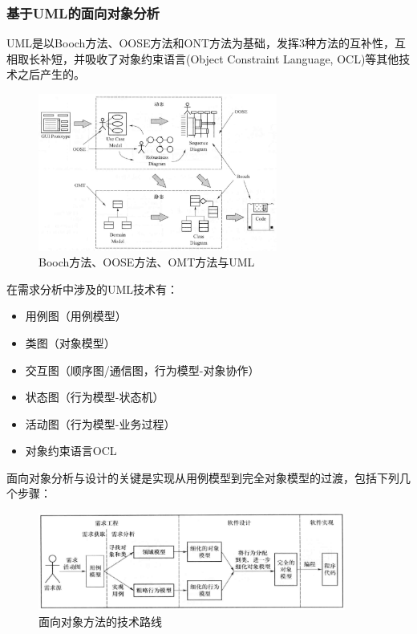 \subsubsection{基于UML的面向对象分析}
UML是以Booch方法、OOSE方法和ONT方法为基础，发挥3种方法的互补性，互相取长补短，并吸收了对象约束语言(Object Constraint Language, OCL)等其他技术之后产生的。
\begin{figure}[H]
	\centering
    \vspace{-0.5em}
	\includegraphics[width=0.7\textwidth]{img/Booch方法、OOSE方法、OMT方法与UML.png}
    \caption*{Booch方法、OOSE方法、OMT方法与UML}
    \vspace{-1em}
\end{figure}

在需求分析中涉及的UML技术有：
\vspace{-0.8em}
\begin{multicols}{2}
    \begin{itemize}
        \item 用例图（用例模型）
        \item 类图（对象模型）
        \item 交互图（顺序图/通信图，行为模型-对象协作）
        \item 状态图（行为模型-状态机）
        \item 活动图（行为模型-业务过程）
        \item 对象约束语言OCL
    \end{itemize}
\end{multicols}
\vspace{-1em}

面向对象分析与设计的关键是实现从用例模型到完全对象模型的过渡，包括下列几个步骤：
\begin{figure}[H]
	\centering
    \vspace{-0.5em}
	\includegraphics[width=0.9\textwidth]{img/面向对象方法的技术路线.png}
    \caption*{面向对象方法的技术路线}
    \vspace{-1em}
\end{figure}

